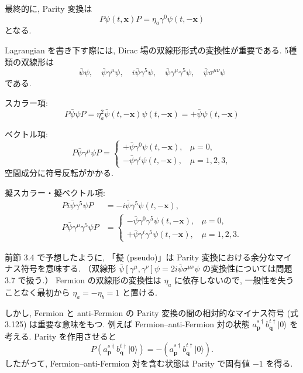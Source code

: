 \documentclass[a4paper,12pt]{article}
\begin{document}
最終的に, Parity 変換は
\begin{equation}
P\psi(t,\mathbf{x})P = \eta_a \gamma^0 \psi(t,-\mathbf{x})
\tag{3.126}
\end{equation}
となる.

Lagrangian を書き下す際には, Dirac 場の双線形形式の変換性が重要である.  
5種類の双線形は
\begin{equation}
\bar{\psi}\psi, \quad \bar{\psi}\gamma^\mu\psi, \quad 
i\bar{\psi}\gamma^5\psi, \quad 
\bar{\psi}\gamma^\mu\gamma^5\psi, \quad 
\bar{\psi}\sigma^{\mu\nu}\psi
\tag{3.127}
\end{equation}
である.

スカラー項:
\begin{equation}
P\bar{\psi}\psi P = \eta_a^2 \bar{\psi}(t,-\mathbf{x})\psi(t,-\mathbf{x})
= +\bar{\psi}\psi(t,-\mathbf{x})
\tag{3.129}
\end{equation}

ベクトル項:
\begin{equation}
P\bar{\psi}\gamma^\mu\psi P =
\begin{cases}
+\bar{\psi}\gamma^0\psi(t,-\mathbf{x}), & \mu=0, \\
-\bar{\psi}\gamma^i\psi(t,-\mathbf{x}), & \mu=1,2,3,
\end{cases}
\tag{3.130}
\end{equation}
空間成分に符号反転がかかる.

擬スカラー・擬ベクトル項:
\begin{align}
P i\bar{\psi}\gamma^5\psi P &= -i\bar{\psi}\gamma^5\psi(t,-\mathbf{x}),
\tag{3.131} \\
P \bar{\psi}\gamma^\mu\gamma^5\psi P &=
\begin{cases}
-\bar{\psi}\gamma^0\gamma^5\psi(t,-\mathbf{x}), & \mu=0, \\
+\bar{\psi}\gamma^i\gamma^5\psi(t,-\mathbf{x}), & \mu=1,2,3.
\end{cases}
\tag{3.132}
\end{align}

前節 3.4 で予想したように, 「擬 (pseudo)」は Parity 変換における余分なマイナス符号を意味する.  
（双線形 $\bar{\psi}[\gamma^\mu,\gamma^\nu]\psi = 2i\bar{\psi}\sigma^{\mu\nu}\psi$ の変換性については問題 3.7 で扱う.）  
Fermion の双線形の変換性は $\eta_a$ に依存しないので, 一般性を失うことなく最初から $\eta_a=-\eta_b=1$ と置ける.  

しかし, Fermion と anti-Fermion の Parity 変換の間の相対的なマイナス符号 (式 3.125) は重要な意味をもつ.  
例えば Fermion–anti-Fermion 対の状態 $a^{s\dagger}_{\mathbf{p}} b^{t\dagger}_{\mathbf{q}}|0\rangle$ を考える.  
Parity を作用させると
\[
P\left(a^{s\dagger}_{\mathbf{p}} b^{t\dagger}_{\mathbf{q}}|0\rangle\right) 
= -(a^{s\dagger}_{\bar{\mathbf{p}}} b^{t\dagger}_{\bar{\mathbf{q}}}|0\rangle).
\]
したがって, Fermion–anti-Fermion 対を含む状態は Parity で固有値 $-1$ を得る.  
\end{document}
